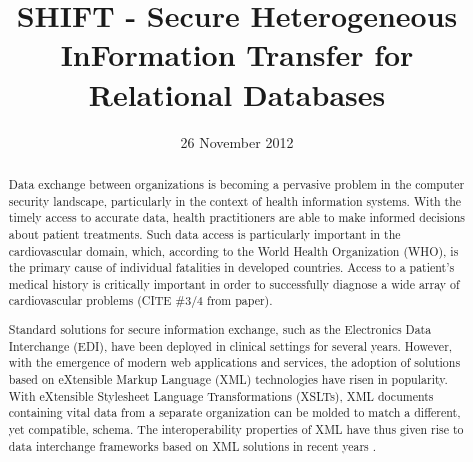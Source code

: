 \documentclass{sig-alternate}
\begin{document}
\title{SHIFT - Secure Heterogeneous InFormation Transfer for Relational Databases}
\author{
}
\date{26 November 2012}
\maketitle
\begin{abstract}

\begin{comment}
  The abstract should be one or two paragraphs that
  summarize your paper. Abstracts are read independently
  from the rest of the paper so you cannot cite your paper
  or other papers in it. Study other abstracts in the papers
  you are reading to understand what an abstract should
  really means. Write the abstract in third person.
  
  TODO: Submit a 1-page description of your project including your sample database 
application, and the security features to be explored. This must be the abstract 
part of a formal research paper using the ACM style LaTeX template (see
myCourses); you will fill in the rest of this report for future phases.

TODO:
1. define the need for the system
2. define how we attempt to extend past solutions with new solution
3. define rationale for JSON/PKI
\end{comment}

Data exchange between organizations is becoming a pervasive problem in the computer
security landscape, particularly in the context of health information systems. With the 
timely access to accurate data, health practitioners are able to make informed decisions
about patient treatments. Such data access is particularly important in the cardiovascular domain,
which, according to the World Health Organization (WHO), is the primary cause of 
individual fatalities in developed countries. Access to a patient's medical history 
is critically important in order to successfully diagnose a wide array of cardiovascular problems (CITE \#3/4 from paper).

Standard solutions for secure information exchange, such as the Electronics Data Interchange (EDI),
have been deployed in clinical settings for several years. However, with the emergence of modern
web applications and services, the adoption of solutions based on eXtensible Markup Language (XML)
technologies have risen in popularity. With eXtensible Stylesheet Language Transformations (XSLTs), 
XML documents containing vital data from a separate organization can be molded to match a different, yet 
compatible, schema. The interoperability properties of XML have thus given rise to data interchange frameworks
based on XML solutions in recent years \cite{Jumaa10-XmlExchange}.


\end{abstract}
\end{document}
